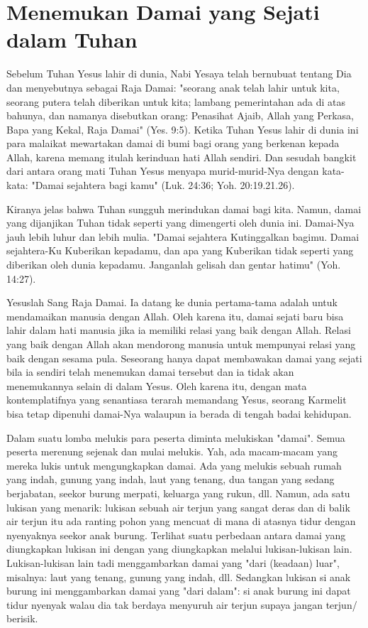 \section*{Menemukan Damai yang Sejati dalam Tuhan}

Sebelum Tuhan Yesus lahir di dunia, Nabi Yesaya telah bernubuat tentang Dia dan menyebutnya sebagai Raja Damai: "seorang anak telah lahir untuk kita, seorang putera telah diberikan untuk kita; lambang pemerintahan ada di atas bahunya, dan namanya disebutkan orang: Penasihat Ajaib, Allah yang Perkasa, Bapa yang Kekal, Raja Damai" (Yes. 9:5). Ketika Tuhan Yesus lahir di dunia ini para malaikat mewartakan damai di bumi bagi orang yang berkenan kepada Allah, karena memang itulah kerinduan hati Allah sendiri. Dan sesudah bangkit dari antara orang mati Tuhan Yesus menyapa murid-murid-Nya dengan kata-kata: "Damai sejahtera bagi kamu" (Luk. 24:36; Yoh. 20:19.21.26). 

Kiranya jelas bahwa Tuhan sungguh merindukan damai bagi kita. Namun, damai yang dijanjikan Tuhan tidak seperti yang dimengerti oleh dunia ini. Damai-Nya jauh lebih luhur dan lebih mulia. "Damai sejahtera Kutinggalkan bagimu. Damai sejahtera-Ku Kuberikan kepadamu, dan apa yang Kuberikan tidak seperti yang diberikan oleh dunia kepadamu. Janganlah gelisah dan gentar hatimu" (Yoh. 14:27).

Yesuslah Sang Raja Damai. Ia datang ke dunia pertama-tama adalah untuk mendamaikan manusia dengan Allah. Oleh karena itu, damai sejati baru bisa lahir dalam hati manusia jika ia memiliki relasi yang baik dengan Allah. Relasi yang baik dengan Allah akan mendorong manusia untuk mempunyai relasi yang baik dengan sesama pula. Seseorang hanya dapat membawakan damai yang sejati bila ia sendiri telah menemukan damai tersebut dan ia tidak akan menemukannya selain di dalam Yesus. Oleh karena itu, dengan mata kontemplatifnya yang senantiasa terarah memandang Yesus, seorang Karmelit bisa tetap dipenuhi damai-Nya walaupun ia berada di tengah badai kehidupan.

Dalam suatu lomba melukis para peserta diminta melukiskan "damai". Semua peserta merenung sejenak dan mulai melukis. Yah, ada macam-macam yang mereka lukis untuk mengungkapkan damai. Ada yang melukis sebuah rumah yang indah, gunung yang indah, laut yang tenang, dua tangan yang sedang berjabatan, seekor burung merpati, keluarga yang rukun, dll. Namun, ada satu lukisan yang menarik: lukisan sebuah air terjun yang sangat deras dan di balik air terjun itu ada ranting pohon yang mencuat di mana di atasnya tidur dengan nyenyaknya seekor anak burung. Terlihat suatu perbedaan antara damai yang diungkapkan lukisan ini dengan yang diungkapkan melalui lukisan-lukisan lain. Lukisan-lukisan lain tadi menggambarkan damai yang "dari (keadaan) luar", misalnya: laut yang tenang, gunung yang indah, dll. Sedangkan lukisan si anak burung ini menggambarkan damai yang "dari dalam": si anak burung ini dapat tidur nyenyak walau dia tak berdaya menyuruh air terjun supaya jangan terjun/ berisik. 

